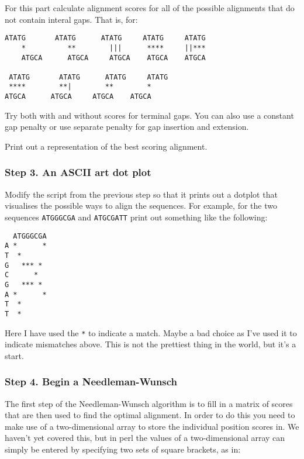 \documentclass[11pt]{article}
\begin{document}
For this part calculate alignment scores for all of the possible alignments
that do not contain interal gaps. That is, for:

\begin{minipage}{\linewidth}
\begin{verbatim}
ATATG       ATATG      ATATG     ATATG     ATATG
    *          **        |||      ****     ||***
    ATGCA      ATGCA     ATGCA    ATGCA    ATGCA

 ATATG       ATATG      ATATG     ATATG 
 ****        **|        **        *
ATGCA      ATGCA     ATGCA    ATGCA    
\end{verbatim}
\end{minipage}

Try both with and without scores for terminal gaps. You can
also use a constant gap penalty 
or use separate penalty for gap insertion and extension.

Print out a representation of the best scoring alignment.

\subsubsection{Step 3. An ASCII art dot plot}
\label{sec-1-3-3}
Modify the script from the previous step so that it prints
out a dotplot that visualises the possible ways to align
the sequences. For example, for the two sequences \texttt{ATGGGCGA}
and \texttt{ATGCGATT} print out something like the following:
\begin{spacing}{0.75}
\begin{verbatim}
  ATGGGCGA
A *      *
T  *     
G   *** *
C      * 
G   *** * 
A *      *
T  *      
T  *      
\end{verbatim}
\end{spacing}
Here I have used the \texttt{*} to indicate a match. Maybe a bad choice
as I've used it to indicate mismatches above. This is not the prettiest
thing in the world, but it's a start.

\subsubsection{Step 4. Begin a Needleman-Wunsch}
\label{sec-1-3-4}
The first step of the Needleman-Wunsch algorithm is to fill in a matrix
of scores that are then used to find the optimal alignment. In order to
do this you need to make use of a two-dimensional array to store the
individual position scores in. We haven't yet covered this, but in perl
the values of a two-dimensional array can simply be entered by specifying
two sets of square brackets, as in:
\end{document}
